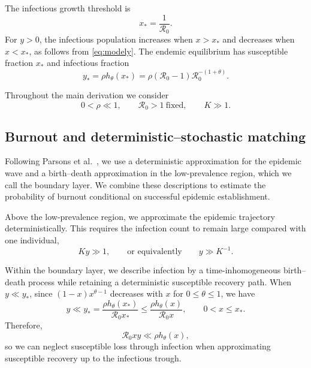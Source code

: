 \documentclass[11pt]{article}
\newcommand{\Rzero}{\mathcal R_0}
\newcommand{\rhoeps}{\rho}
\newcommand{\hth}{h_\theta}
\newcommand{\xs}{x_*}
\begin{document}
The infectious growth threshold is
\begin{equation}
\xs=\frac{1}{\Rzero}.
\label{eq:xstar}
\end{equation}
For \(y>0\), the infectious population increases when \(x>\xs\) and decreases when \(x<\xs\), as follows from \cref{eq:modely}.
The endemic equilibrium has susceptible fraction \(\xs\) and infectious fraction
\begin{equation}
y_*=\rhoeps\hth(\xs)=\rhoeps(\Rzero-1)\Rzero^{-(1+\theta)}.
\label{eq:ystar}
\end{equation}

Throughout the main derivation we consider
\begin{equation}
0<\rhoeps\ll1,\qquad \Rzero>1\ \text{fixed},\qquad K\gg1.
\label{eq:regime}
\end{equation}

\subsection{Burnout and deterministic--stochastic matching}
\label{sec:framework}
Following Parsons et al.\ \cite{ParsonsEtAl2024}, we use a deterministic approximation for the epidemic wave and a birth--death approximation in the low-prevalence region, which we call the boundary layer. We combine these descriptions to estimate the probability of burnout conditional on successful epidemic establishment.

Above the low-prevalence region, we approximate the epidemic trajectory deterministically. This requires the infection count to remain large compared with one individual,
\begin{equation}
Ky\gg1,\qquad\text{or equivalently}\qquad y\gg K^{-1}.
\label{eq:deterministic-count-condition}
\end{equation}

Within the boundary layer, we describe infection by a time-inhomogeneous birth--death process while retaining a deterministic susceptible recovery path. When \(y\ll y_*\), since \((1-x)x^{\theta-1}\) decreases with \(x\) for \(0\le\theta\le1\), we have
\begin{equation}
y\ll y_*=\frac{\rhoeps\hth(\xs)}{\Rzero\xs}
\le\frac{\rhoeps\hth(x)}{\Rzero x},
\qquad 0<x\le\xs.
\label{eq:low-prevalence-scale-bound}
\end{equation}
Therefore,
\begin{equation}
\Rzero xy\ll\rhoeps\hth(x),
\label{eq:low-prevalence-loss-condition}
\end{equation}
so we can neglect susceptible loss through infection when approximating susceptible recovery up to the infectious trough.
\end{document}
